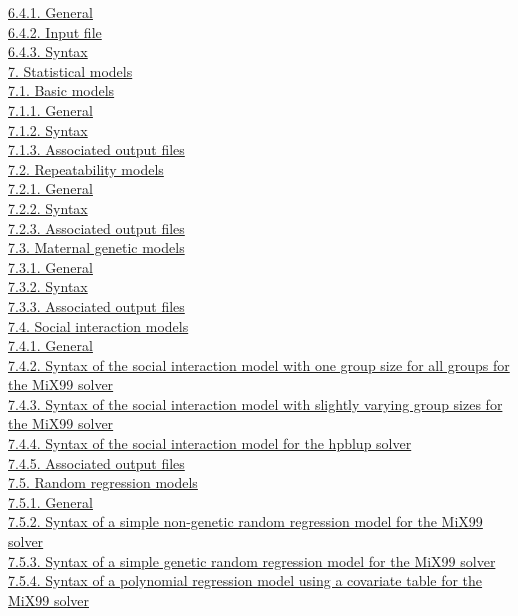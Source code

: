 \hyperref[Comp16]{6.4.1. General}\\
\hyperref[Comp17]{6.4.2. Input file}\\
\hyperref[Comp18]{6.4.3. Syntax}\\
\hyperref[Stat01]{7. Statistical models}\\
\hyperref[Stat02]{7.1. Basic models}\\
\hyperref[Stat03]{7.1.1. General}\\
\hyperref[Stat04]{7.1.2. Syntax}\\
\hyperref[Stat05]{7.1.3. Associated output files}\\
\hyperref[Stat06]{7.2. Repeatability models}\\
\hyperref[Stat07]{7.2.1. General}\\
\hyperref[Stat08]{7.2.2. Syntax}\\
\hyperref[Stat09]{7.2.3. Associated output files}\\
\hyperref[Stat10]{7.3. Maternal genetic models}\\
\hyperref[Stat11]{7.3.1. General}\\
\hyperref[Stat12]{7.3.2. Syntax}\\
\hyperref[Stat13]{7.3.3. Associated output files}\\
\hyperref[Stat14]{7.4. Social interaction models}\\
\hyperref[Stat15]{7.4.1. General}\\
\hyperref[Stat16]{7.4.2. Syntax of the social interaction model with one
group size for all groups for the MiX99 solver}\\
\hyperref[Stat17]{7.4.3. Syntax of the social interaction model with
slightly varying group sizes for the MiX99 solver}\\
\hyperref[Stat18]{7.4.4. Syntax of the social interaction model for the
hpblup solver}\\
\hyperref[Stat19]{7.4.5. Associated output files}\\
\hyperref[Stat20]{7.5. Random regression models}\\
\hyperref[Stat21]{7.5.1. General}\\
\hyperref[Stat22]{7.5.2. Syntax of a simple non-genetic random
regression model for the MiX99 solver}\\
\hyperref[Stat23]{7.5.3. Syntax of a simple genetic random regression
model for the MiX99 solver}\\
\hyperref[Stat24]{7.5.4. Syntax of a polynomial regression model using a
covariate table for the MiX99 solver}\\
